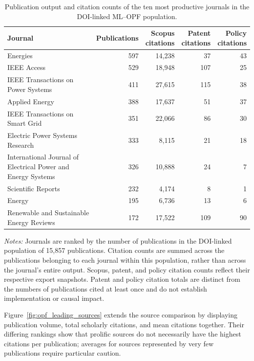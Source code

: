 \documentclass[a4paper,fleqn]{cas-sc}
\begin{document}
\begin{table}[htbp]
\centering
\caption{Publication output and citation counts of the ten most productive journals in the DOI-linked ML--OPF population.}
\label{tab:opf_leading_academic_sources}
\scriptsize
\setlength{\tabcolsep}{4pt}
\renewcommand{\arraystretch}{1.15}
\begin{tabularx}{\textwidth}{Xrrrr}
\toprule
Journal & Publications & \shortstack{Scopus\\citations} & \shortstack{Patent\\citations} & \shortstack{Policy\\citations} \\
\midrule
Energies & 597 & 14,238 & 37 & 43 \\
IEEE Access & 529 & 18,948 & 107 & 25 \\
IEEE Transactions on Power Systems & 411 & 27,615 & 115 & 38 \\
Applied Energy & 388 & 17,637 & 51 & 37 \\
IEEE Transactions on Smart Grid & 351 & 22,066 & 86 & 30 \\
Electric Power Systems Research & 333 & 8,115 & 21 & 18 \\
International Journal of Electrical Power and Energy Systems & 326 & 10,888 & 24 & 7 \\
Scientific Reports & 232 & 4,174 & 8 & 1 \\
Energy & 195 & 6,736 & 13 & 6 \\
Renewable and Sustainable Energy Reviews & 172 & 17,522 & 109 & 90 \\
\bottomrule
\end{tabularx}
\vspace{2mm}
\begin{minipage}{\textwidth}
\footnotesize
\textit{Notes:} Journals are ranked by the number of publications in the DOI-linked population of 15,857 publications. Citation counts are summed across the publications belonging to each journal within this population, rather than across the journal's entire output. Scopus, patent, and policy citation counts reflect their respective export snapshots. Patent and policy citation totals are distinct from the numbers of publications cited at least once and do not establish implementation or causal impact.
\end{minipage}
\end{table}

Figure~\ref{fig:opf_leading_sources} extends the source comparison by displaying publication volume, total scholarly citations, and mean citations together. Their differing rankings show that prolific sources do not necessarily have the highest citations per publication; averages for sources represented by very few publications require particular caution.
\end{document}
